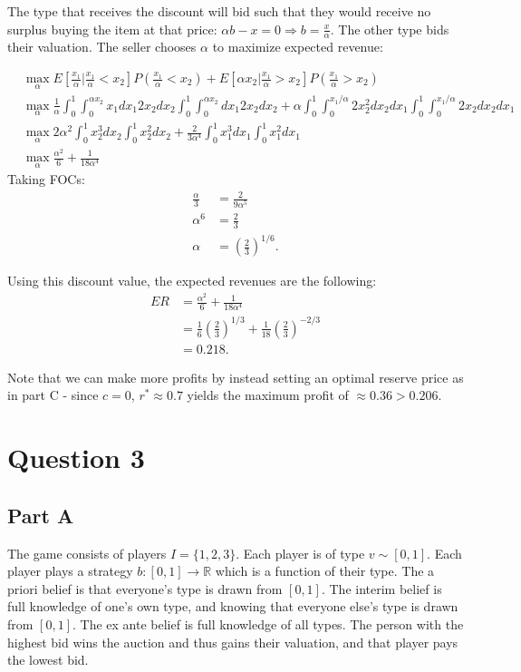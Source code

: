 \documentclass[11pt]{article} %
\begin{document}
The type that receives the discount will bid such that they would receive no surplus buying the item at that price: $\alpha b - x = 0\Rightarrow b = \frac{x}{\alpha}$. The other type bids their valuation. The seller chooses $\alpha$ to maximize expected revenue:

\begin{align*}
&\max_{\alpha} E\left[\frac{x_1}{\alpha}|\frac{x_1}{\alpha}<x_2\right] P\left(\frac{x_1}{\alpha}<x_2\right) + E\left[\alpha x_2|\frac{x_1}{\alpha}>x_2\right] P\left(\frac{x_1}{\alpha}>x_2\right)\\
&\max_{\alpha} \frac{1}{\alpha}\int_{0}^1\int_{0}^{\alpha x_2} x_1 dx_1 2x_2 dx_2 \int_{0}^1\int_{0}^{\alpha x_2} dx_1 2x_2 dx_2 + \alpha \int_{0}^1\int_{0}^{x_1/\alpha} 2x_2^2 dx_2 dx_1 \int_{0}^1\int_{0}^{x_1/\alpha}2x_2 dx_2  dx_1 \\
&\max_{\alpha} 2\alpha^2\int_{0}^1 x_2^3  dx_2 \int_{0}^1 x_2^2 dx_2 + \frac{2}{3\alpha^4}\int_{0}^1 x_1^3 dx_1 \int_{0}^1 x_1^2 dx_1 \\
&\max_{\alpha} \frac{\alpha^2}{6}+ \frac{1}{18\alpha^4} 
\end{align*}
Taking FOCs:
\begin{align*}
\frac{\alpha}{3} &= \frac{2}{9\alpha^5}\\
\alpha^6 &= \frac{2}{3}\\
\alpha &= \left( \frac{2}{3} \right)^{1/6}.
\end{align*}

Using this discount value, the expected revenues are the following:
\begin{align*}
ER &=  \frac{\alpha^2}{6}+ \frac{1}{18\alpha^4} \\
&= \frac{1}{6}\left( \frac{2}{3} \right)^{1/3} + \frac{1}{18}\left( \frac{2}{3} \right)^{-2/3}\\
&= 0.218.
\end{align*}

Note that we can make more profits by instead setting an optimal reserve price as in part C - since $c=0$, $r^{*} \approx 0.7$ yields the maximum profit of $\approx 0.36>0.206$.

\section{Question 3}
\subsection{Part A}
The game consists of players $I = \{ 1,2,3\}$. Each player is of type $v \sim  [0,1]$. Each player plays a strategy $b:[0,1]\rightarrow \mathbb{R}$ which is a function of their type. The a priori belief is that everyone's type is drawn from $[0,1]$. The interim belief is full knowledge of one's own type, and knowing that everyone else's type is drawn from $[0,1]$. The ex ante belief is full knowledge of all types. The person with the highest bid wins the auction and thus gains their valuation, and that player pays the lowest bid.
\end{document}
